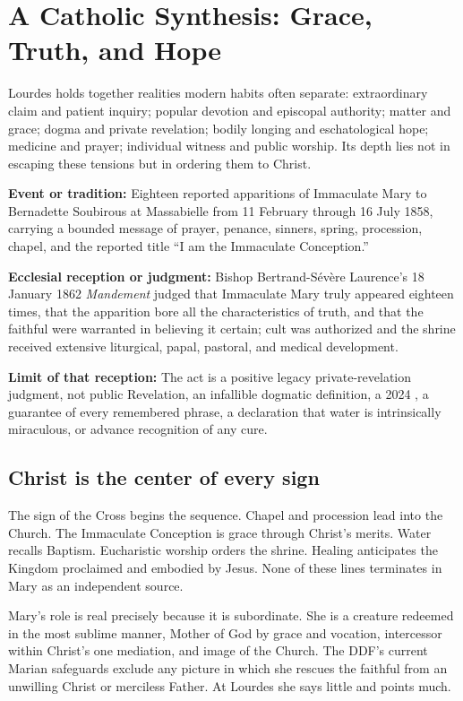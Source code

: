 \section{A Catholic Synthesis: Grace, Truth, and Hope}

Lourdes holds together realities modern habits often separate: extraordinary claim and patient inquiry; popular devotion and episcopal authority; matter and grace; dogma and private revelation; bodily longing and eschatological hope; medicine and prayer; individual witness and public worship. Its depth lies not in escaping these tensions but in ordering them to Christ.

\begin{studyframe}
\textbf{Event or tradition:} Eighteen reported apparitions of Immaculate Mary to Bernadette Soubirous at Massabielle from 11 February through 16 July 1858, carrying a bounded message of prayer, penance, sinners, spring, procession, chapel, and the reported title “I am the Immaculate Conception.”\par
\textbf{Ecclesial reception or judgment:} Bishop Bertrand-Sévère Laurence's 18 January 1862 \emph{Mandement} judged that Immaculate Mary truly appeared eighteen times, that the apparition bore all the characteristics of truth, and that the faithful were warranted in believing it certain; cult was authorized and the shrine received extensive liturgical, papal, pastoral, and medical development.\par
\textbf{Limit of that reception:} The act is a positive legacy private-revelation judgment, not public Revelation, an infallible dogmatic definition, a 2024 , a guarantee of every remembered phrase, a declaration that water is intrinsically miraculous, or advance recognition of any cure.
\end{studyframe}

\subsection{Christ is the center of every sign}

The sign of the Cross begins the sequence. Chapel and procession lead into the Church. The Immaculate Conception is grace through Christ's merits. Water recalls Baptism. Eucharistic worship orders the shrine. Healing anticipates the Kingdom proclaimed and embodied by Jesus. None of these lines terminates in Mary as an independent source.

Mary's role is real precisely because it is subordinate. She is a creature redeemed in the most sublime manner, Mother of God by grace and vocation, intercessor within Christ's one mediation, and image of the Church. The DDF's current Marian safeguards exclude any picture in which she rescues the faithful from an unwilling Christ or merciless Father. At Lourdes she says little and points much.

